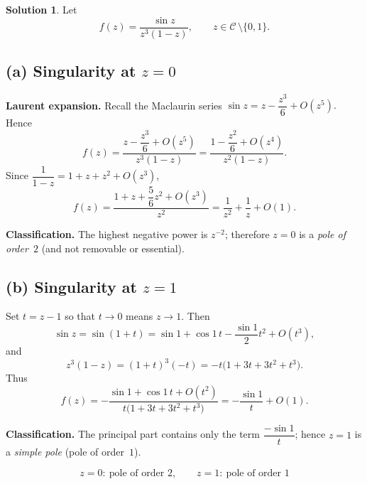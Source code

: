 \documentclass[12pt]{article}
\theoremstyle{definition} %
\newtheorem{solution}{Solution}
\theoremstyle{plain} %
\begin{document}
          \begin{solution}
            Let
            \[
               f(z)=\frac{\sin z}{z^{3}(1-z)},\qquad z\in\mathcal{C}\,\setminus\{0,1\}.
            \]
            
            \subsection*{(a)  Singularity at \(z=0\)}
            
            \textbf{Laurent expansion.}  
            Recall the Maclaurin series
            \(
               \sin z = z-\dfrac{z^{3}}{6}+O(z^{5}).
            \)
            Hence
            \[
               f(z)=\frac{z-\dfrac{z^{3}}{6}+O(z^{5})}{z^{3}(1-z)}
                   =\frac{1-\dfrac{z^{2}}{6}+O(z^{4})}{z^{2}(1-z)}.
            \]
            Since \(\dfrac1{1-z}=1+z+z^{2}+O(z^{3})\),
            \[
               f(z)=\frac{1+z+\dfrac{5}{6}z^{2}+O(z^{3})}{z^{2}}
                    =\frac{1}{z^{2}}+\frac{1}{z}+O(1).
            \]
            
            \textbf{Classification.}  
            The highest negative power is \(z^{-2}\); therefore \(z=0\) is a
            \emph{pole of order \(2\)} (and not removable or essential).
            
            \subsection*{(b)  Singularity at \(z=1\)}
            
            Set \(t=z-1\) so that \(t\to0\) means \(z\to1\).
            Then
            \[
               \sin z
                  =\sin(1+t)
                  =\sin1+\cos1\,t-\frac{\sin1}{2}t^{2}+O(t^{3}),
            \]
            and
            \[
               z^{3}(1-z)=(1+t)^{3}(-t)=-t\bigl(1+3t+3t^{2}+t^{3}\bigr).
            \]
            Thus
            \[
               f(z)
               =-\frac{\sin1+\cos1\,t+O(t^{2})}{t\bigl(1+3t+3t^{2}+t^{3}\bigr)}
               =-\frac{\sin1}{t}+O(1).
            \]
            
            \textbf{Classification.}  
            The principal part contains only the term \(\dfrac{-\sin1}{t}\);
            hence \(z=1\) is a \emph{simple pole} (pole of order \(1\)).
            
            \bigskip
            \[
            \boxed{\;
               z=0:\ \text{pole of order }2,\qquad
               z=1:\ \text{pole of order }1
            \;}
            \]
            \end{solution}
\end{document}

